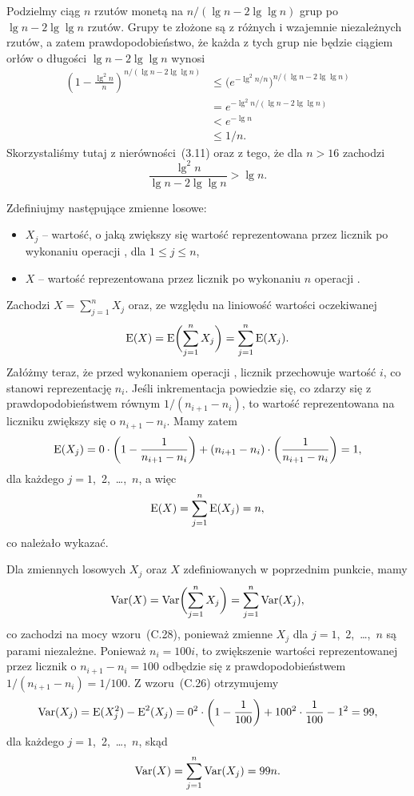 Podzielmy ciąg $n$ rzutów monetą na $n/(\lg n-2\lg\lg n)$ grup po $\lg n-2\lg\lg n$ rzutów. Grupy te złożone są z różnych i wzajemnie niezależnych rzutów, a zatem prawdopodobieństwo, że każda z tych grup nie będzie ciągiem orłów o długości $\lg n-2\lg\lg n$ wynosi
\begin{align*}
	\left(1-\frac{\lg^2n}{n}\right)^{n/(\lg n-2\lg\lg n)} &\le \bigl(e^{-\lg^2n/n}\bigr)^{n/(\lg n-2\lg\lg n)} \\
	&= e^{-\lg^2n/(\lg n-2\lg\lg n)} \\
	&< e^{-\lg n} \\
	&\le 1/n.
\end{align*}
Skorzystaliśmy tutaj z nierówności~(3.11) oraz z tego, że dla $n>16$ zachodzi
\[
	\frac{\lg^2n}{\lg n-2\lg\lg n} > \lg n.
\]

\problems


\subexercise{} %
Zdefiniujmy następujące zmienne losowe:
\begin{itemize}
	\item $X_j$ -- wartość, o jaką zwiększy się wartość reprezentowana przez licznik po  wykonaniu operacji , dla $1\le j\le n$,
	\item $X$ -- wartość reprezentowana przez licznik po wykonaniu $n$ operacji .
\end{itemize}
Zachodzi $X=\sum_{j=1}^nX_j$ oraz, ze względu na liniowość wartości oczekiwanej
\[
	\operatorname{E}(X) = \operatorname{E}\biggl(\sum_{j=1}^nX_j\biggr) = \sum_{j=1}^n\operatorname{E}(X_j).
\]
Załóżmy teraz, że przed wykonaniem  operacji , licznik przechowuje wartość $i$, co stanowi reprezentację $n_i$. Jeśli inkrementacja powiedzie się, co zdarzy się z prawdopodobieństwem równym $1/(n_{i+1}-n_i)$, to wartość reprezentowana na liczniku zwiększy się o $n_{i+1}-n_i$. Mamy zatem
\[
	\operatorname{E}(X_j) = 0\cdot\left(1-\frac{1}{n_{i+1}-n_i}\right)+(n_{i+1}-n_i)\cdot\left(\frac{1}{n_{i+1}-n_i}\right) = 1,
\]
dla każdego $j=1$,~2,~\dots,~$n$, a więc
\[
	\operatorname{E}(X) = \sum_{j=1}^n\operatorname{E}(X_j) = n,
\]
co należało wykazać.

\subexercise{} %
Dla zmiennych losowych $X_j$ oraz $X$ zdefiniowanych w poprzednim punkcie, mamy
\[
	\operatorname{Var}(X) = \operatorname{Var}\biggl(\sum_{j=1}^nX_j\biggr) = \sum_{j=1}^n\operatorname{Var}(X_j),
\]
co zachodzi na mocy wzoru~(C.28), ponieważ zmienne $X_j$ dla $j=1$,~2,~\dots,~$n$ są parami niezależne. Ponieważ $n_i=100i$, to zwiększenie wartości reprezentowanej przez licznik o $n_{i+1}-n_i=100$ odbędzie się z prawdopodobieństwem $1/(n_{i+1}-n_i)=1/100$. Z wzoru~(C.26) otrzymujemy
\[
	\operatorname{Var}(X_j) = \operatorname{E}(X_j^2)-\operatorname{E}^2(X_j) = 0^2\cdot\left(1-\frac{1}{100}\right)+100^2\cdot\frac{1}{100}-1^2 = 99,
\]
dla każdego $j=1$,~2,~\dots,~$n$, skąd
\[
	\operatorname{Var}(X) = \sum_{j=1}^n\operatorname{Var}(X_j) = 99n.
\]

